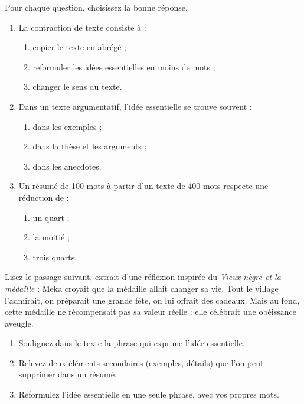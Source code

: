 \documentclass[11pt]{article}
\begin{document}
\begin{exercice}[QCM]
Pour chaque question, choisissez la bonne réponse.
\begin{enumerate}
\item La contraction de texte consiste à :
\begin{enumerate}
\item[a)] copier le texte en abrégé ;
\item[b)] reformuler les idées essentielles en moins de mots ;
\item[c)] changer le sens du texte.
\end{enumerate}
\item Dans un texte argumentatif, l'idée essentielle se trouve souvent :
\begin{enumerate}
\item[a)] dans les exemples ;
\item[b)] dans la thèse et les arguments ;
\item[c)] dans les anecdotes.
\end{enumerate}
\item Un résumé de 100 mots à partir d'un texte de 400 mots respecte une réduction de :
\begin{enumerate}
\item[a)] un quart ;
\item[b)] la moitié ;
\item[c)] trois quarts.
\end{enumerate}
\end{enumerate}
\end{exercice}

\begin{exercice}
Lisez le passage suivant, extrait d'une réflexion inspirée du \emph{Vieux nègre et la médaille} : \og Meka croyait que la médaille allait changer sa vie. Tout le village l'admirait, on préparait une grande fête, on lui offrait des cadeaux. Mais au fond, cette médaille ne récompensait pas sa valeur réelle : elle célébrait une obéissance aveugle. \fg
\begin{enumerate}
\item Soulignez dans le texte la phrase qui exprime l'idée essentielle.
\item Relevez deux éléments secondaires (exemples, détails) que l'on peut supprimer dans un résumé.
\item Reformulez l'idée essentielle en une seule phrase, avec vos propres mots.
\end{enumerate}
\end{exercice}
\end{document}
